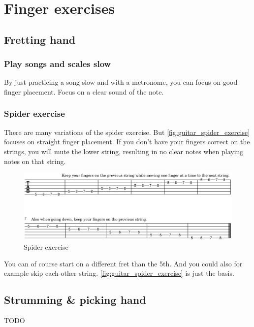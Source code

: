 \chapter{Finger exercises} \label{chap:finger_exercises}

\section{Fretting hand}

\subsection{Play songs and scales slow}

By just practicing a song slow and with a metronome, you can focus on good finger placement. Focus on a clear sound of the note.

\subsection{Spider exercise}

There are many variations of the spider exercise. But \autoref{fig:guitar_spider_exercise} focuses on straight finger placement. If you don't have your fingers correct on the strings, you will mute the lower string, resulting in no clear notes when playing notes on that string.

\begin{figure}[h]
	\centering
	\includegraphics[width=\textwidth]{../../MuseScore/Guitar/guitar_basic_spider_exercise.png}
	\caption{Spider exercise}
	\label{fig:guitar_spider_exercise}
\end{figure}

You can of course start on a different fret than the 5th. And you could also for example skip each-other string. \autoref{fig:guitar_spider_exercise} is just the basis.

\section{Strumming \& picking hand}
TODO